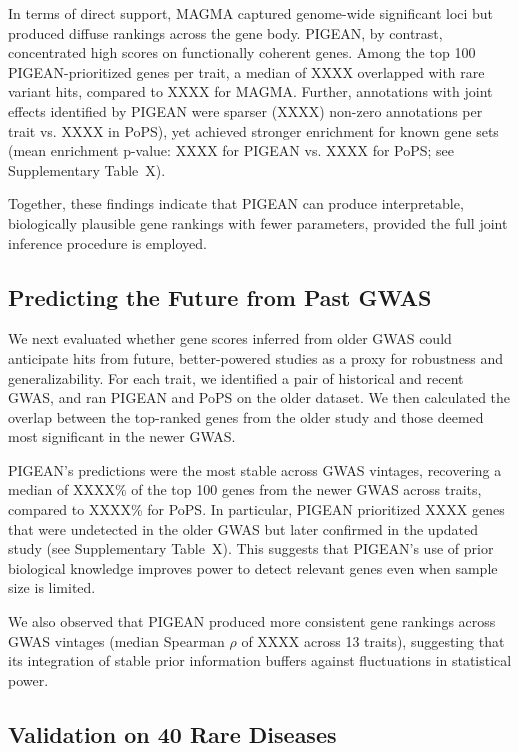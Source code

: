 \documentclass[sn-nature,lineno]{sn-jnl}%
\theoremstyle{thmstyleone}%
\theoremstyle{thmstyletwo}%
\theoremstyle{thmstylethree}%
\begin{document}
In terms of direct support, MAGMA captured genome-wide significant loci but produced diffuse rankings across the gene body. PIGEAN, by contrast, concentrated high scores on functionally coherent genes. Among the top 100 PIGEAN-prioritized genes per trait, a median of XXXX overlapped with rare variant hits, compared to XXXX for MAGMA. Further, annotations with joint effects identified by PIGEAN were sparser (XXXX) non-zero annotations per trait vs. XXXX in PoPS), yet achieved stronger enrichment for known gene sets (mean enrichment p-value: XXXX for PIGEAN vs. XXXX for PoPS; see Supplementary Table~X).

Together, these findings indicate that PIGEAN can produce interpretable, biologically plausible gene rankings with fewer parameters, provided the full joint inference procedure is employed.

\subsection{Predicting the Future from Past GWAS}
We next evaluated whether gene scores inferred from older GWAS could anticipate hits from future, better-powered studies as a proxy for robustness and generalizability. For each trait, we identified a pair of historical and recent GWAS, and ran PIGEAN and PoPS on the older dataset. We then calculated the overlap between the top-ranked genes from the older study and those deemed most significant in the newer GWAS.

PIGEAN's predictions were the most stable across GWAS vintages, recovering a median of XXXX\% of the top 100 genes from the newer GWAS across traits, compared to XXXX\% for PoPS. In particular, PIGEAN prioritized XXXX genes that were undetected in the older GWAS but later confirmed in the updated study (see Supplementary Table~X). This suggests that PIGEAN's use of prior biological knowledge improves power to detect relevant genes even when sample size is limited.

We also observed that PIGEAN produced more consistent gene rankings across GWAS vintages (median Spearman $\rho$ of XXXX across 13 traits), suggesting that its integration of stable prior information buffers against fluctuations in statistical power.

\subsection{Validation on 40 Rare Diseases} \label{sec:rare-disease-validation}
\end{document}
